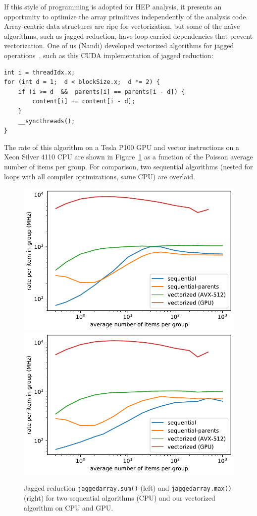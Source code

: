 \documentclass{webofc}
\begin{document}
If this style of programming is adopted for HEP analysis, it presents an opportunity to optimize the array primitives independently of the analysis code. Array-centric data structures are ripe for vectorization, but some of the na\"ive algorithms, such as jagged reduction, have loop-carried dependencies that prevent vectorization. One of us (Nandi) developed vectorized algorithms for jagged operations~\cite{jaydeep}, such as this CUDA implementation of jagged reduction:
\begin{center}
\begin{minipage}{0.7\linewidth}
{\small\begin{verbatim}
int i = threadIdx.x;
for (int d = 1;  d < blockSize.x;  d *= 2) {
    if (i >= d  &&  parents[i] == parents[i - d]) {
        content[i] += content[i - d];
    }
    __syncthreads();
}
\end{verbatim}
}
\end{minipage}
\end{center}
\noindent The rate of this algorithm on a Tesla P100 GPU and vector instructions on a Xeon Silver 4110 CPU are shown in Figure~\ref{rates_logy} as a function of the Poisson average number of items per group. For comparison, two sequential algorithms (nested for loops with all compiler optimizations, same CPU) are overlaid.

\begin{figure}
\includegraphics[width=0.5\linewidth]{sum_rates_logy.pdf}\includegraphics[width=0.5\linewidth]{max_rates_logy.pdf}

\caption{Jagged reduction \texttt{jaggedarray.sum()} (left) and \texttt{jaggedarray.max()} (right) for two sequential algorithms (CPU) and our vectorized algorithm on CPU and GPU. \label{rates_logy}}
\vspace{-0.35 cm}
\end{figure}
\end{document}
